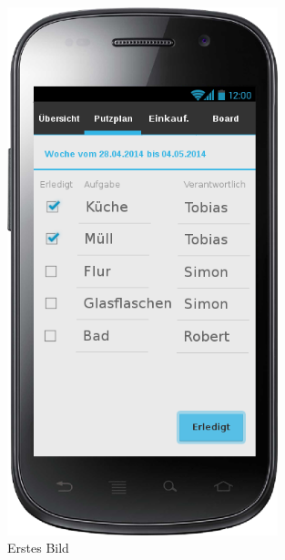 \begin{figure}[H] 
  \centering
     \includegraphics[width=0.7\textwidth]{anhang/mockups/putzplan.png}
  \caption{Erstes Bild}
  \label{fig:Bild1}
\end{figure}

